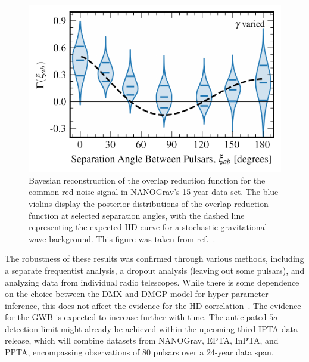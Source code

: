 \begin{figure}[t]
	\centering
	\includegraphics[width=.8\columnwidth]{thesisplots/ng15/nano15_splineorf_vg_violinplot_fig1}
	\caption{
		Bayesian reconstruction of the overlap reduction function for the common red noise signal in \ac{NANOGrav}’s 15-year data set. The blue violins display the posterior distributions of the overlap reduction function at selected separation angles, with the dashed line representing the expected \ac{HD} curve for a stochastic gravitational wave background. This figure was taken from ref.~\cite{NANOGrav:2023gor}.
		\label{fig:spectrum_correlations_plot2}}
\end{figure}

The robustness of these results was confirmed through various methods, including a separate frequentist analysis, a dropout analysis (leaving out some pulsars), and analyzing data from individual radio telescopes. While there is some dependence on the choice between the \acs{DMX} and \acs{DMGP} model for hyper-parameter inference, this does not affect the  evidence for the \ac{HD} correlation~\cite{NANOGrav:2023gor}. The evidence for the \ac{GWB} is expected to increase further with time. The anticipated $5\sigma$ detection limit might already be achieved within the upcoming third \acs{IPTA} data release, which will combine datasets from \acs{NANOGrav}, \acs{EPTA}, \acs{InPTA}, and \acs{PPTA}, encompassing observations of 80 pulsars over a 24-year data span.

